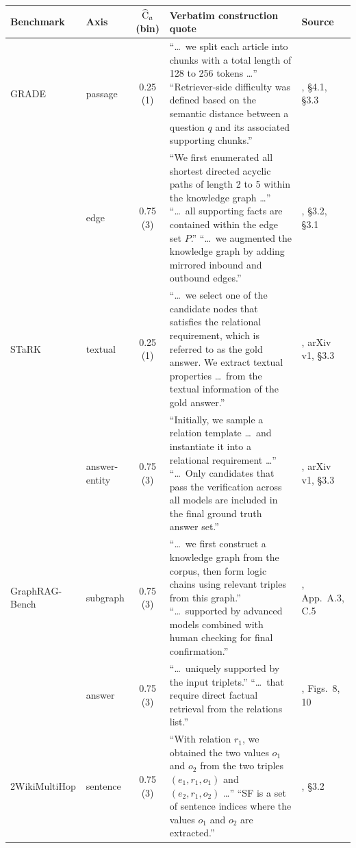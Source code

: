 \begin{table}[p]\centering\footnotesize
\setlength{\tabcolsep}{3pt}\emergencystretch=2pt
\begin{tabular}{@{}p{}p{}cp{}p{}@{}}
\toprule
\raggedright Benchmark & Axis & $\widehat{\mathrm{C}}_a$ (bin) & Verbatim construction quote & \raggedright Source\tabularnewline
\midrule
\raggedright GRADE & passage & 0.25 (1) & ``\ldots\ we split each article into chunks with a total length of 128 to 256 tokens \ldots'' ``Retriever-side difficulty was defined based on the semantic distance between a question $q$ and its associated supporting chunks.'' & \raggedright \citealp{lee2025grade}, \S4.1, \S3.3\tabularnewline
 & edge & 0.75 (3) & ``We first enumerated all shortest directed acyclic paths of length 2 to 5 within the knowledge graph \ldots'' ``\ldots\ all supporting facts are contained within the edge set $P$.'' ``\ldots\ we augmented the knowledge graph by adding mirrored inbound and outbound edges.'' & \raggedright \citealp{lee2025grade}, \S3.2, \S3.1\tabularnewline
\addlinespace[1.5pt]
\raggedright STaRK & textual & 0.25 (1) & ``\ldots\ we select one of the candidate nodes that satisfies the relational requirement, which is referred to as the gold answer. We extract textual properties \ldots\ from the textual information of the gold answer.'' & \raggedright \citealp{wu2024stark}, arXiv v1, \S3.3\tabularnewline
 & answer-entity & 0.75 (3) & ``Initially, we sample a relation template \ldots\ and instantiate it into a relational requirement \ldots'' ``\ldots\ Only candidates that pass the verification across all models are included in the final ground truth answer set.'' & \raggedright \citealp{wu2024stark}, arXiv v1, \S3.3\tabularnewline
\addlinespace[1.5pt]
\raggedright GraphRAG-Bench & subgraph & 0.75 (3) & ``\ldots\ we first construct a knowledge graph from the corpus, then form logic chains using relevant triples from this graph.'' ``\ldots\ supported by advanced models combined with human checking for final confirmation.'' & \raggedright \citealp{graphragbench2025}, App.~A.3, C.5\tabularnewline
 & answer & 0.75 (3) & ``\ldots\ uniquely supported by the input triplets.'' ``\ldots\ that require direct factual retrieval from the relations list.'' & \raggedright \citealp{graphragbench2025}, Figs.~8, 10\tabularnewline
\addlinespace[1.5pt]
\raggedright 2WikiMultiHop & sentence & 0.75 (3) & ``With relation $r_1$, we obtained the two values $o_1$ and $o_2$ from the two triples $(e_1, r_1, o_1)$ and $(e_2, r_1, o_2)$ \ldots'' ``SF is a set of sentence indices where the values $o_1$ and $o_2$ are extracted.'' & \raggedright \citealp{ho2020twowiki}, \S3.2\tabularnewline

\end{tabular}
\end{table}
